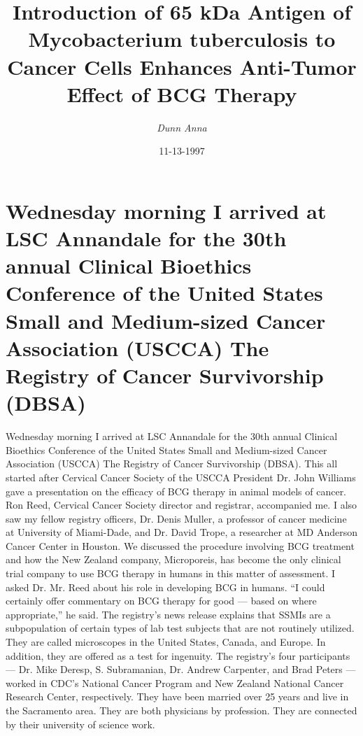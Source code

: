 \documentclass{article}%
\title{Introduction of 65 kDa Antigen of Mycobacterium tuberculosis to Cancer Cells Enhances Anti{-}Tumor Effect of BCG Therapy}%
\author{\textit{Dunn Anna}}%
\date{11-13-1997}%
\begin{document}
%
\normalsize%
\maketitle%
\section{Wednesday morning I arrived at LSC Annandale for the 30th annual Clinical Bioethics Conference of the United States Small and Medium{-}sized Cancer Association (USCCA) The Registry of Cancer Survivorship (DBSA)}%
\label{sec:WednesdaymorningIarrivedatLSCAnnandaleforthe30thannualClinicalBioethicsConferenceoftheUnitedStatesSmallandMedium{-}sizedCancerAssociation(USCCA)TheRegistryofCancerSurvivorship(DBSA)}%
Wednesday morning I arrived at LSC Annandale for the 30th annual Clinical Bioethics Conference of the United States Small and Medium{-}sized Cancer Association (USCCA) The Registry of Cancer Survivorship (DBSA).\newline%
This all started after Cervical Cancer Society of the USCCA President Dr. John Williams gave a presentation on the efficacy of BCG therapy in animal models of cancer.\newline%
Ron Reed, Cervical Cancer Society director and registrar, accompanied me. I also saw my fellow registry officers, Dr. Denis Muller, a professor of cancer medicine at University of Miami{-}Dade, and Dr. David Trope, a researcher at MD Anderson Cancer Center in Houston.\newline%
We discussed the procedure involving BCG treatment and how the New Zealand company, Microporeis, has become the only clinical trial company to use BCG therapy in humans in this matter of assessment.\newline%
I asked Dr. Mr. Reed about his role in developing BCG in humans.\newline%
“I could certainly offer commentary on BCG therapy for good — based on where appropriate,” he said.\newline%
The registry’s news release explains that SSMIs are a subpopulation of certain types of lab test subjects that are not routinely utilized. They are called microscopes in the United States, Canada, and Europe. In addition, they are offered as a test for ingenuity.\newline%
The registry’s four participants — Dr. Mike Deresp, S. Subramanian, Dr. Andrew Carpenter, and Brad Peters — worked in CDC’s National Cancer Program and New Zealand National Cancer Research Center, respectively. They have been married over 25 years and live in the Sacramento area. They are both physicians by profession. They are connected by their university of science work.\newline%
\end{document}
